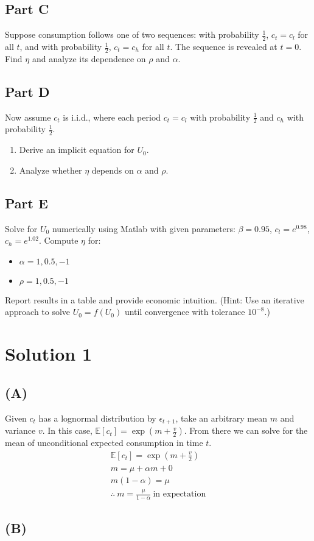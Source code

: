\documentclass[10pt,a4paper]{article}
\begin{document}
  \subsection*{Part C}
    Suppose consumption follows one of two sequences: with probability $\frac{1}{2}$, $c_t = c_l$ for all $t$, and with probability $\frac{1}{2}$, $c_t = c_h$ for all $t$. The sequence is revealed at $t = 0$. Find $\eta$ and analyze its dependence on $\rho$ and $\alpha$.

  \subsection*{Part D}
    Now assume $c_t$ is i.i.d., where each period $c_t = c_l$ with probability $\frac{1}{2}$ and $c_h$ with probability $\frac{1}{2}$.
    \begin{enumerate}
        \item Derive an implicit equation for $U_0$.
        \item Analyze whether $\eta$ depends on $\alpha$ and $\rho$.
    \end{enumerate}

  \subsection*{Part E}
    Solve for $U_0$ numerically using Matlab with given parameters: $\beta = 0.95$, $c_l = e^{0.98}$, $c_h = e^{1.02}$. Compute $\eta$ for:
    \begin{itemize}
        \item $\alpha = 1, 0.5, -1$
        \item $\rho = 1, 0.5, -1$
    \end{itemize}
    Report results in a table and provide economic intuition.
    (Hint: Use an iterative approach to solve $U_0 = f(U_0)$ until convergence with tolerance $10^{-8}$.)
\section{Solution 1}
  \subsection*{(A)}
    Given $c_t$ has a lognormal distribution by $\epsilon_{t+1}$, take an arbitrary mean $m$ and variance $v$. In this case, $\mathbb{E}[c_t] = \exp(m + \frac{v}{2})$. From there we can solve for the mean of unconditional expected consumption in time $t$.
    \begin{gather*}
      \mathbb{E}[c_t] = \exp(m + \frac{v}{2}) \\
      m = \mu + \alpha m + 0 \\
      m(1-\alpha) = \mu \\
      \therefore \ m = \frac{\mu}{1-\alpha} \ \text{in expectation}
    \end{gather*}
  \subsection{(B)}
    
\end{document}
